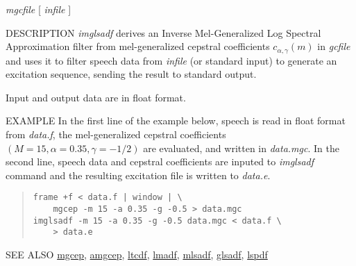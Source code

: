\begin{synopsis}
\item [imglsadf] [ --m $M$ ] [ --a $A$ ] [ --g $G$ ] [ --p $P$ ]
		 [ --i $I$ ]  [ --t ]  [ --k ]
\item [\ ~~~~~~~~~] {\em mgcfile} [ {\em infile} ]
\end{synopsis}

\begin{qsection}{DESCRIPTION}
{\em imglsadf} derives an Inverse Mel-Generalized 
Log Spectral Approximation filter from 
mel-generalized cepstral coefficients $c_{\alpha,\gamma}(m)$ in {\em gcfile} 
and uses it to filter speech data from {\em infile} (or standard input) 
to generate an excitation sequence,
sending the result to standard output.

Input and output data are in float format.
\end{qsection}

\begin{options} 
\end{options}

\begin{qsection}{EXAMPLE}
In the first line of the example below, 
speech is read in float format from {\em data.f},
the mel-generalized cepstral coefficients $(M=15,\alpha=0.35,\gamma=-1/2)$
are evaluated, and written in {\em data.mgc}.
In the second line,
speech data and cepstral coefficients are
inputed to {\em imglsadf} command and the resulting excitation file
is written to {\em data.e}.
\begin{quote}
 \verb!frame +f < data.f | window | \!\\
 \verb!    mgcep -m 15 -a 0.35 -g -0.5 > data.mgc!\\
 \verb!imglsadf -m 15 -a 0.35 -g -0.5 data.mgc < data.f \!\\
 \verb!    > data.e!
\end{quote} 
\end{qsection}

\begin{qsection}{SEE ALSO}
\hyperlink{mgcep}{mgcep},
\hyperlink{amgcep}{amgcep},
\hyperlink{ltcdf}{ltcdf},
\hyperlink{lmadf}{lmadf},
\hyperlink{mlsadf}{mlsadf},
\hyperlink{glsadf}{glsadf},
\hyperlink{lspdf}{lspdf}
\end{qsection}
